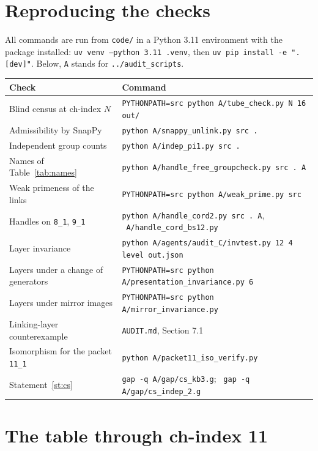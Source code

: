 \documentclass[11pt]{amsart}
\newcommand{\lab}[1]{\texttt{#1}}
\newcommand{\file}[1]{\texttt{#1}}
\theoremstyle{plain}
\theoremstyle{remark}
\begin{document}
\appendix
\section{Reproducing the checks}

All commands are run from \file{code/} in a Python 3.11 environment with the package installed:
\texttt{uv venv --python 3.11 .venv}, then \texttt{uv pip install -e ".[dev]"}. Below, \texttt{A} stands
for \file{../audit\_scripts}.

\begin{center}
\small
\begin{tabular}{@{}p{}p{}@{}}
\toprule
Check & Command \\
\midrule
Blind census at ch-index $N$ & \texttt{PYTHONPATH=src python A/tube\_check.py N 16 out/} \\
Admissibility by SnapPy & \texttt{python A/snappy\_unlink.py src .} \\
Independent group counts & \texttt{python A/indep\_pi1.py src .} \\
Names of Table~\ref{tab:names} & \texttt{python A/handle\_free\_groupcheck.py src . A} \\
Weak primeness of the links & \texttt{PYTHONPATH=src python A/weak\_prime.py src} \\
Handles on \lab{8\_1}, \lab{9\_1} & \texttt{python A/handle\_cord2.py src . A}, \ \texttt{A/handle\_cord\_bs12.py} \\
Layer invariance & \texttt{python A/agents/audit\_C/invtest.py 12 4 level out.json} \\
Layers under a change of generators & \texttt{PYTHONPATH=src python A/presentation\_invariance.py 6} \\
Layers under mirror images & \texttt{PYTHONPATH=src python A/mirror\_invariance.py} \\
Linking-layer counterexample & \file{AUDIT.md}, Section 7.1 \\
Isomorphism for the packet \lab{11\_1} & \texttt{python A/packet11\_iso\_verify.py} \\
Statement~\ref{st:cs} & \texttt{gap -q A/gap/cs\_kb3.g}; \ \texttt{gap -q A/gap/cs\_indep\_2.g} \\
\bottomrule
\end{tabular}
\end{center}

\section{The table through ch-index 11}\label{app:table}
\end{document}
